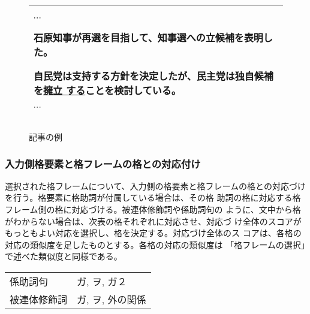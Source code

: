\documentclass{nlp}
\begin{document}
\begin{figure}[t]
 \begin{center}
  \begin{tabular}{|l|} \hline
   \begin{minipage}{12cm}

    \vspace*{1ex}

    $\cdots$

    \vspace*{1ex}

    石原知事が再選を目指して、知事選への立候補を表明した。

    \vspace*{2ex}

    自民党は支持する方針を決定したが、民主党は独自候補を\underline{擁立
    する}ことを検討している。

    \vspace*{1ex}

    $\cdots$

    \vspace*{1ex}

   \end{minipage} \\ \hline
  \end{tabular}
 \caption{記事の例}
 \label{図::記事の例}
 \end{center}
\end{figure}


\subsubsection{入力側格要素と格フレームの格との対応付け}

選択された格フレームについて、入力側の格要素と格フレームの格との対応づけ
を行う\cite{Kuro-IEICE1994}。格要素に格助詞が付属している場合は、その格
助詞の格に対応する格フレーム側の格に対応づける。被連体修飾詞や係助詞句の
ように、文中から格がわからない場合は、次表の格それぞれに対応させ、対応づ
け全体のスコアがもっともよい対応を選択し、格を決定する。対応づけ全体のス
コアは、各格の対応の類似度を足したものとする。各格の対応の類似度は
「格フレームの選択」で述べた類似度と同様である。
\begin{center}
 \begin{tabular}{l@{ : }l} \hline
  係助詞句 & ガ, ヲ, ガ２\footnotemark[2] \\ 
  被連体修飾詞 & ガ, ヲ, 外の関係 \\ \hline
 \end{tabular}
\end{center}
\end{document}
